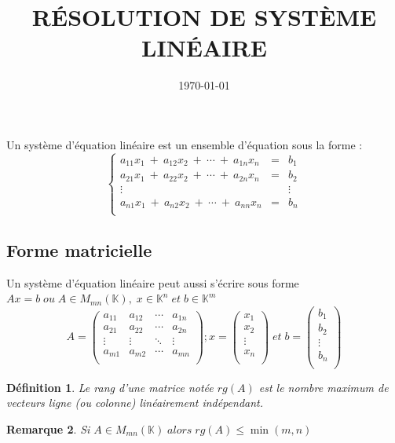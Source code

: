 \documentclass[a4paper, 12pt, french]{article}
\date{\today}
\author{}
\title{RÉSOLUTION DE SYSTÈME LINÉAIRE}
\theoremstyle{break}
\newtheorem{defin}{Définition}[section]
\newtheorem{rema}[defin]{Remarque}
\begin{document}
\maketitle
Un système d'équation linéaire est un ensemble d'équation sous la forme :
$$\left\lbrace\begin{array}{lll}
    a_{11}x_{1} \: + \: a_{12}x_{2} \: + \: \cdots \: + \: a_{1n}x_{n} & = & b_{1} \\
    a_{21}x_{1} \: + \: a_{22}x_{2} \: + \: \cdots \: + \: a_{2n}x_{n} & = & b_{2} \\
    \vdots &  & \vdots \\
    a_{n1}x_{1} \: + \: a_{n2}x_{2} \: + \: \cdots \: + \: a_{nn}x_{n} & = & b_{n} \\
\end{array} \right .$$

\begin{center}\section{Forme matricielle}\end{center}
Un système d'équation linéaire peut aussi s'écrire sous forme $Ax=b \; ou \; A \in M_{mn}(\mathbb{K}),\; x \in \mathbb{K}^{n} \; et \; b \in \mathbb{K}^{m}$
$$A = \left(\begin{array}{cccc}
    a_{11} & a_{12} & \cdots & a_{1n} \\
    a_{21} & a_{22} & \cdots & a_{2n} \\
    \vdots & \vdots & \ddots & \vdots \\
    a_{m1} & a_{m2} & \cdots & a_{mn} \\
    \end{array}\right) ; 
    x = \left(\begin{array}{cccc}
    x_{1}\\
    x_{2}\\
    \vdots \\
    x_{n} \\
    \end{array}\right)
    \; et \; 
    b = \left(\begin{array}{ccc}
    b_{1}\\
    b_{2}\\
    \vdots \\
    b_{n} \\
    \end{array}\right)$$


\begin{defin}
    Le rang d'une matrice notée $rg(A)$ est le nombre maximum de vecteurs ligne (ou colonne) linéairement indépendant.
\end{defin}
\begin{rema}
    Si $A \in M_{mn}(\mathbb{K}) \; alors \; rg(A) \leq \min(m,n)$
\end{rema}
\end{document}

